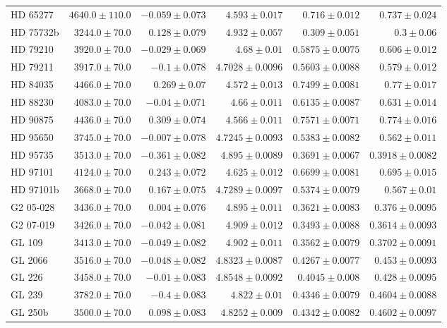 \begin{longtable*}{lrrrrr}
HD 65277 & $4640.0\pm 110.0$ & $-0.059\pm 0.073$ & $4.593\pm 0.017$ & $0.716\pm 0.012$ & $0.737\pm 0.024$ \\ 
HD 75732b & $3244.0\pm 70.0$ & $0.128\pm 0.079$ & $4.932\pm 0.057$ & $0.309\pm 0.051$ & $0.3\pm 0.06$ \\ 
HD 79210 & $3920.0\pm 70.0$ & $-0.029\pm 0.069$ & $4.68\pm 0.01$ & $0.5875\pm 0.0075$ & $0.606\pm 0.012$ \\ 
HD 79211 & $3917.0\pm 70.0$ & $-0.1\pm 0.078$ & $4.7028\pm 0.0096$ & $0.5603\pm 0.0088$ & $0.579\pm 0.012$ \\ 
HD 84035 & $4466.0\pm 70.0$ & $0.269\pm 0.07$ & $4.572\pm 0.013$ & $0.7499\pm 0.0081$ & $0.77\pm 0.017$ \\ 
HD 88230 & $4083.0\pm 70.0$ & $-0.04\pm 0.071$ & $4.66\pm 0.011$ & $0.6135\pm 0.0087$ & $0.631\pm 0.014$ \\ 
HD 90875 & $4436.0\pm 70.0$ & $0.309\pm 0.074$ & $4.566\pm 0.011$ & $0.7571\pm 0.0071$ & $0.774\pm 0.016$ \\ 
HD 95650 & $3745.0\pm 70.0$ & $-0.007\pm 0.078$ & $4.7245\pm 0.0093$ & $0.5383\pm 0.0082$ & $0.562\pm 0.011$ \\ 
HD 95735 & $3513.0\pm 70.0$ & $-0.361\pm 0.082$ & $4.895\pm 0.0089$ & $0.3691\pm 0.0067$ & $0.3918\pm 0.0082$ \\ 
HD 97101 & $4124.0\pm 70.0$ & $0.243\pm 0.072$ & $4.625\pm 0.012$ & $0.6699\pm 0.0081$ & $0.695\pm 0.015$ \\ 
HD 97101b & $3668.0\pm 70.0$ & $0.167\pm 0.075$ & $4.7289\pm 0.0097$ & $0.5374\pm 0.0079$ & $0.567\pm 0.01$ \\ 
G2 05-028 & $3436.0\pm 70.0$ & $0.004\pm 0.076$ & $4.895\pm 0.011$ & $0.3621\pm 0.0083$ & $0.376\pm 0.0095$ \\ 
G2 07-019 & $3426.0\pm 70.0$ & $-0.042\pm 0.081$ & $4.909\pm 0.012$ & $0.3493\pm 0.0088$ & $0.3614\pm 0.0093$ \\ 
GL 109 & $3413.0\pm 70.0$ & $-0.049\pm 0.082$ & $4.902\pm 0.011$ & $0.3562\pm 0.0079$ & $0.3702\pm 0.0091$ \\ 
GL 2066 & $3516.0\pm 70.0$ & $-0.048\pm 0.082$ & $4.8323\pm 0.0087$ & $0.4267\pm 0.0077$ & $0.453\pm 0.0093$ \\ 
GL 226 & $3458.0\pm 70.0$ & $-0.01\pm 0.083$ & $4.8548\pm 0.0092$ & $0.4045\pm 0.008$ & $0.428\pm 0.0095$ \\ 
GL 239 & $3782.0\pm 70.0$ & $-0.4\pm 0.083$ & $4.822\pm 0.01$ & $0.4346\pm 0.0079$ & $0.4604\pm 0.0088$ \\ 
GL 250b & $3500.0\pm 70.0$ & $0.098\pm 0.083$ & $4.8252\pm 0.009$ & $0.4342\pm 0.0082$ & $0.4602\pm 0.0097$ \\ 

\end{longtable*}
